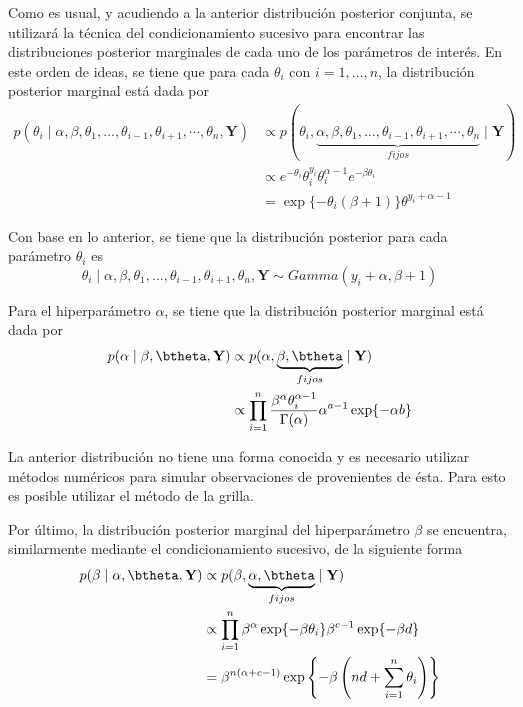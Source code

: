 Como es usual, y acudiendo a la anterior distribución posterior conjunta, se utilizará la técnica del condicionamiento sucesivo para encontrar las distribuciones posterior marginales de cada uno de los parámetros de interés. En este orden de ideas, se tiene que para cada $\theta_i$ con $i=1,\ldots,n$, la distribución posterior marginal está dada por
\begin{align*}
p(\theta_i \mid \alpha,\beta,\theta_1,\ldots,\theta_{i-1},\theta_{i+1},\cdots,\theta_n,\mathbf{Y})
&\propto
p(\theta_i, \underbrace{\alpha,\beta,\theta_1,\ldots,\theta_{i-1},\theta_{i+1},\cdots,\theta_n}_{fijos}\mid\mathbf{Y})\\
&\propto e^{-\theta_i}\theta_i^{y_i}\theta_i^{\alpha-1}e^{-\beta\theta_i}\\
&= \exp\{-\theta_i(\beta+1)\}\theta^{y_i+\alpha-1}
\end{align*}

Con base en lo anterior, se tiene que la distribución posterior para cada parámetro $\theta_i$ es
\begin{equation*}
\theta_i\mid \alpha,\beta,\theta_1,\ldots,\theta_{i-1},\theta_{i+1},\theta_n,\mathbf{Y}
\sim Gamma(y_i+\alpha, \beta+1)
\end{equation*}

Para el hiperparámetro $\alpha$, se tiene que la distribución posterior marginal está dada por
\begin{align*}
p(\alpha\mid \beta, \btheta, \mathbf{Y})
&\propto p(\alpha, \underbrace{\beta,\btheta}_{fijos}\mid\mathbf{Y})\\
&\propto \prod_{i=1}^n \frac{\beta^\alpha\theta_i^{\alpha-1}}{\Gamma(\alpha)}\alpha^{a-1}\exp\{-\alpha b\}
\end{align*}

La anterior distribución no tiene una forma conocida y es necesario utilizar métodos numéricos para simular observaciones de provenientes de ésta. Para esto es posible utilizar el método de la grilla.

Por último, la distribución posterior marginal del hiperparámetro $\beta$ se encuentra, similarmente mediante el condicionamiento sucesivo, de la siguiente forma
\begin{align*}
p(\beta \mid \alpha,\btheta,\mathbf{Y})
&\propto p(\beta, \underbrace{\alpha,\btheta}_{fijos}\mid\mathbf{Y})\\
&\propto \prod_{i=1}^n \beta^{\alpha}\exp\{-\beta\theta_i\}\beta^{c-1}\exp\{-\beta d\}\\
&=\beta^{n(\alpha+c-1)}\exp\left\{-\beta\left(nd+\sum_{i=1}^n\theta_i\right)\right\}
\end{align*}

